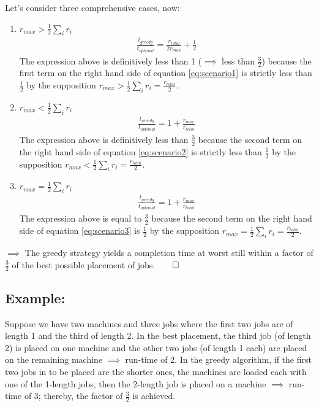 \documentclass[conference]{styles/acmsiggraph}
\newcommand{\?}{\stackrel{?}{=}}
\begin{document}
Let's consider three comprehensive cases, now:
\begin{enumerate}
    \item $r_{max} > \frac{1}{2} \sum_{i}r_i$
    \begin{align} \label{eq:scenario1}
        \frac{ t_{greedy}}{t_{optimal}} = \frac{r_{total}}{2r_{max}} + \frac{1}{2}
    \end{align}
    The expression above is definitively less than 1 ($\implies$ less than $\frac{3}{2}$) because the first term on the right hand side of equation \ref{eq:scenario1} is strictly less than $\frac{1}{2}$ by the supposition $r_{max} > \frac{1}{2} \sum_{i}r_i = \frac{r_{total}}{2}$.
    
    \item $r_{max} < \frac{1}{2} \sum_{i}r_i$
    \begin{align} \label{eq:scenario2}
        \frac{ t_{greedy}}{t_{optimal}} = 1 + \frac{r_{max}}{r_{total}}
    \end{align}
    The expression above is definitively less than $\frac{3}{2}$ because the second term on the right hand side of equation \ref{eq:scenario2} is strictly less than $\frac{1}{2}$ by the supposition $r_{max} < \frac{1}{2} \sum_{i}r_i = \frac{r_{total}}{2}$.
    
    \item $r_{max} = \frac{1}{2} \sum_{i}r_i$
    \begin{align} \label{eq:scenario3}
        \frac{ t_{greedy}}{t_{optimal}} = 1 + \frac{r_{max}}{r_{total}}
    \end{align}
    The expression above is equal to $\frac{3}{2}$ because the second term on the right hand side of equation \ref{eq:scenario3} is $\frac{1}{2}$ by the supposition $r_{max} = \frac{1}{2} \sum_{i}r_i = \frac{r_{total}}{2}$. \\
\end{enumerate}

$\implies$ The greedy strategy yields a completion time at worst still within a factor of $\frac{3}{2}$ of the best possible placement of jobs.$\qed$

\subsection{Example:}
Suppose we have two machines and three jobs where the first two jobs are of length 1 and the third of length 2.  In the best placement, the third job (of length 2) is placed on one machine and the other two jobs (of length 1 each) are placed on the remaining machine $\implies$ run-time of 2.  In the greedy algorithm, if the first two jobs in to be placed are the shorter ones, the machines are loaded each with one of the 1-length jobs, then the 2-length job is placed on a machine $\implies$ run-time of 3; thereby, the factor of $\frac{3}{2}$ is achieved.
\end{document}

